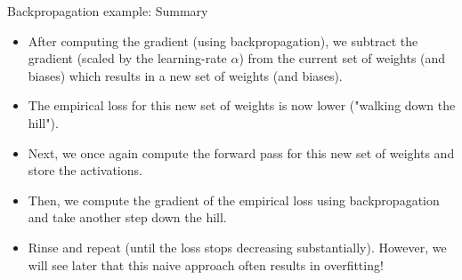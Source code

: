 \begin{frame} {Backpropagation example: Summary}
  \begin{itemize}
    \item After computing the gradient (using backpropagation), we subtract the gradient (scaled by the learning-rate $\alpha$) from the current set of weights (and biases) which results in a new set of weights (and biases).
    \item The empirical loss for this new set of weights is now lower ("walking down the hill").
    \item Next, we once again compute the forward pass for this new set of weights and store the activations.
    \item Then, we compute the gradient of the empirical loss using backpropagation and take another step down the hill.
    \item Rinse and repeat (until the loss stops decreasing substantially). 
      However, we will see later that this naive approach often results in overfitting!
  \end{itemize}
\end{frame}

\endlecture
